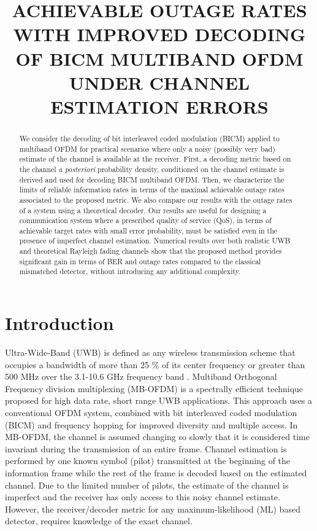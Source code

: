 \documentclass{article}
\title{ACHIEVABLE OUTAGE RATES WITH IMPROVED DECODING OF BICM MULTIBAND OFDM UNDER CHANNEL ESTIMATION ERRORS}
\begin{document}
\ninept
\maketitle
\begin{abstract}
We consider the decoding of bit interleaved coded modulation (BICM) applied to multiband OFDM for practical scenarios where only a noisy (possibly very bad) estimate of the channel is available at the receiver. First, a decoding metric based on the channel {\it a posteriori} probability density, conditioned on the channel estimate is derived and used for decoding BICM multiband OFDM. Then, we characterize the limits of reliable information rates in terms of the maximal achievable outage rates associated to the proposed metric. We also compare our results with the outage rates of a system using a theoretical decoder. Our results are useful for designing a communication system where a prescribed quality of service (QoS), in terms of achievable target rates with small error probability, must be satisfied even in the presence of imperfect channel estimation.   
Numerical results over both realistic UWB and theoretical Rayleigh fading channels show that the proposed method provides significant gain in terms of BER and outage rates compared to the classical mismatched detector, without introducing any additional complexity. 
\end{abstract}
\section{Introduction}
\label{sec:intro}
Ultra-Wide-Band (UWB) is defined as any wireless transmission scheme that occupies a bandwidth of more than 25 \% of its center frequency or greater than 500 MHz over the 3.1-10.6 GHz frequency band \cite{fcc}. Multiband Orthogonal Frequency division multiplexing (MB-OFDM) \cite{batra_jour} is a spectrally efficient technique proposed for high data rate, short range UWB applications. This approach uses a conventional OFDM system, combined with bit interleaved coded modulation (BICM) and frequency hopping for improved diversity and multiple access. In MB-OFDM, the channel is assumed changing so slowly that it is considered time invariant during the transmission of an entire frame.    
Channel estimation is performed by one known symbol (pilot) transmitted at the beginning of the information frame while the rest of the frame is decoded based on the estimated channel. Due to the limited number of pilots, the estimate of the channel is imperfect and the receiver has only access to this noisy channel estimate. However, the receiver/decoder metric for any maximum-likelihood (ML) based detector, requires knowledge of the exact channel.
\end{document}
